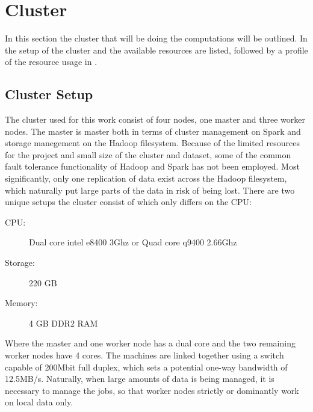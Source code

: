 \section{Cluster}\label{sec:cluster}
In this section the cluster that will be doing the computations will be outlined. In  the setup of the cluster and the available resources are listed, followed by a profile of the resource usage in .

\subsection{Cluster Setup}\label{sec:clustersetup}

The cluster used for this work consist of four nodes, one master and three worker nodes. The master is master both in terms of cluster management on Spark and storage manegement on the Hadoop filesystem. Because of the limited resources for the project and small size of the cluster and dataset, some of the common fault tolerance functionality of Hadoop and Spark has not been employed. Most significantly, only one replication of data exist across the Hadoop filesystem, which naturally put large parts of the data in risk of being lost. There are two unique setups the cluster consist of which only differs on the CPU:\@
\begin{description}
\item[CPU:] Dual core intel e8400 3Ghz or Quad core q9400 2.66Ghz
\item[Storage:] 220 GB
\item[Memory:] 4 GB DDR2 RAM
\end{description}

Where the master and one worker node has a dual core and the two remaining worker nodes have 4 cores. The machines are linked together using a switch capable of 200Mbit full duplex, which sets a potential one-way bandwidth of 12.5MB/s. Naturally, when large amounts of data is being managed, it is necessary to manage the jobs, so that worker nodes strictly or dominantly work on local data only.



